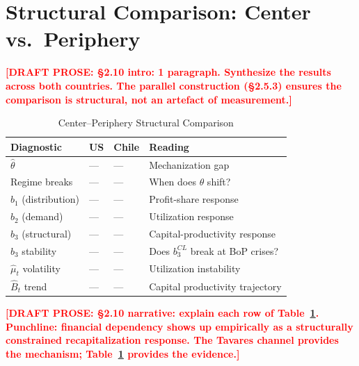 \documentclass[12pt,letterpaper]{article}
\newcommand{\draftnote}[1]{%
  \textcolor{red}{\textbf{[DRAFT PROSE: #1]}}}
\begin{document}
\section{Structural Comparison: Center vs.\ Periphery}
\label{sec:comparison}

\draftnote{§2.10 intro: 1 paragraph. Synthesize the results across both countries.
  The parallel construction (§2.5.3) ensures the comparison is structural,
  not an artefact of measurement.}

\begin{table}[h]
  \centering
  \caption{Center--Periphery Structural Comparison}
  \label{tab:comparison}
  \begin{tabular}{llll}
    \toprule
    Diagnostic & US & Chile & Reading \\
    \midrule
    $\hat{\theta}$               & --- & --- & Mechanization gap \\
    Regime breaks                & --- & --- & When does $\theta$ shift? \\
    $b_1$ (distribution)         & --- & --- & Profit-share response \\
    $b_2$ (demand)               & --- & --- & Utilization response \\
    $b_3$ (structural)           & --- & --- & Capital-productivity response \\
    $b_3$ stability              & --- & --- & Does $b_3^{CL}$ break at BoP crises? \\
    $\widehat{\mu}_t$ volatility & --- & --- & Utilization instability \\
    $\hat{B}_t$ trend            & --- & --- & Capital productivity trajectory \\
    \bottomrule
  \end{tabular}
  \bigskip

\end{table}

\draftnote{§2.10 narrative: explain each row of Table~\ref{tab:comparison}.
  Punchline: financial dependency shows up empirically as a structurally
  constrained recapitalization response. The Tavares channel provides the
  mechanism; Table~\ref{tab:comparison} provides the evidence.}
\end{document}
